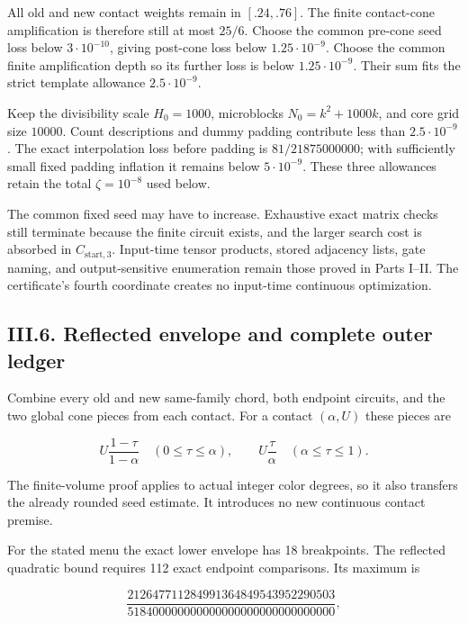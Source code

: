 All old and new contact weights remain in \([.24,.76]\). The finite contact-cone amplification is therefore still at most \(25/6\). Choose the common pre-cone seed loss below \(3\cdot10^{-10}\), giving post-cone loss below \(1.25\cdot10^{-9}\). Choose the common finite amplification depth so its further loss is below \(1.25\cdot10^{-9}\). Their sum fits the strict template allowance \(2.5\cdot10^{-9}\).

Keep the divisibility scale \(H_0=1000\), microblocks \(N_0=k^2+1000k\), and core grid size \(10000\). Count descriptions and dummy padding contribute less than \(2.5\cdot10^{-9}\). The exact interpolation loss before padding is \(81/21875000000\); with sufficiently small fixed padding inflation it remains below \(5\cdot10^{-9}\). These three allowances retain the total \(\zeta=10^{-8}\) used below.

The common fixed seed may have to increase. Exhaustive exact matrix checks still terminate because the finite circuit exists, and the larger search cost is absorbed in \(C_{\mathrm{start},3}\). Input-time tensor products, stored adjacency lists, gate naming, and output-sensitive enumeration remain those proved in Parts I--II. The certificate's fourth coordinate creates no input-time continuous optimization.

\hypertarget{af-a9ec399514-iii.6.-reflected-envelope-and-complete-outer-ledger}{%
\subsection{III.6. Reflected envelope and complete outer ledger}\label{af-a9ec399514-iii.6.-reflected-envelope-and-complete-outer-ledger}}

Combine every old and new same-family chord, both endpoint circuits, and the two global cone pieces from each contact. For a contact \((\alpha,U)\) these pieces are

\[
U\frac{1-\tau}{1-\alpha}\quad(0\le\tau\le\alpha),\qquad
U\frac{\tau}{\alpha}\quad(\alpha\le\tau\le1).
\]

The finite-volume proof applies to actual integer color degrees, so it also transfers the already rounded seed estimate. It introduces no new continuous contact premise.

For the stated menu the exact lower envelope has 18 breakpoints. The reflected quadratic bound requires 112 exact endpoint comparisons. Its maximum is

\[
\frac{212647711284991364849543952290503}
     {518400000000000000000000000000000},
\tag{T13}
\]


